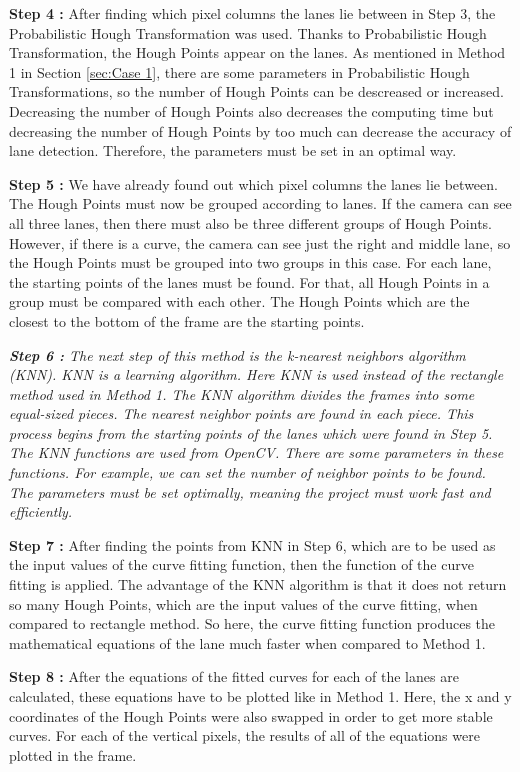 \textbf{Step 4 : }After finding which pixel columns the lanes lie between in Step 3, the Probabilistic Hough Transformation was used. Thanks to Probabilistic Hough Transformation, the Hough Points appear on the lanes. As mentioned in Method 1 in Section \ref{sec:Case 1}, there are some parameters in Probabilistic Hough Transformations, so the number of Hough Points can be descreased or increased. Decreasing the number of Hough Points also decreases the computing time but decreasing the number of Hough Points by too much can decrease the accuracy of lane detection. Therefore, the parameters must be set in an optimal way.

\textbf{Step 5 : }We have already found out which pixel columns the lanes lie between. The Hough Points must now be grouped according to lanes. If the camera can see all three lanes, then there must also be three different groups of Hough Points. However, if there is a curve, the camera can see just the right and middle lane, so the Hough Points must be grouped into two groups in this case. For each lane, the starting points of the lanes must be found. For that, all Hough Points in a group must be compared with each other. The Hough Points which are the closest to the bottom of the frame are the starting points.

\emph{\color{green}\textbf{Step 6 : }The next step of this method is the k-nearest neighbors algorithm (KNN). KNN is a learning algorithm. Here KNN is used instead of the rectangle method used in Method 1. The KNN algorithm divides the frames into some equal-sized pieces. The nearest neighbor points are found in each piece. This process begins from the starting points of the lanes which were found in Step 5. The KNN functions are used from OpenCV. There are some parameters in these functions. For example, we can set the number of neighbor points to be found. The parameters must be set optimally, meaning the project must work fast and efficiently.}

\textbf{Step 7 : }After finding the points from KNN in Step 6, which are to be used as the input values of the curve fitting function, then the function of the curve fitting is applied. The advantage of the KNN algorithm is that it does not return so many Hough Points, which are the input values of the curve fitting, when compared to rectangle method. So here, the curve fitting function produces the mathematical equations of the lane much faster when compared to Method 1.

\textbf{Step 8 : }After the equations of the fitted curves for each of the lanes are calculated, these equations have to be plotted like in Method 1. Here, the x and y coordinates of the Hough Points were also swapped in order to get more stable curves. For each of the vertical pixels, the results of all of the equations were plotted in the frame.


